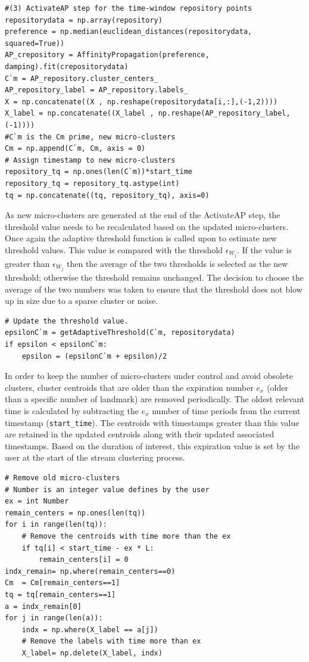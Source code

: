 \begin{lstlisting}
#(3) ActivateAP step for the time-window repository points
repositorydata = np.array(repository)
preference = np.median(euclidean_distances(repositorydata, squared=True))
AP_crepository = AffinityPropagation(preference, damping).fit(crepositorydata)
C`m = AP_repository.cluster_centers_
AP_repository_label = AP_repository.labels_
X = np.concatenate((X , np.reshape(repositorydata[i,:],(-1,2))))
X_label = np.concatenate((X_label , np.reshape(AP_repository_label,(-1))))
#C`m is the Cm prime, new micro-clusters
Cm = np.append(C`m, Cm, axis = 0)
# Assign timestamp to new micro-clusters
repository_tq = np.ones(len(C`m))*start_time
repository_tq = repository_tq.astype(int)
tq = np.concatenate((tq, repository_tq), axis=0)
\end{lstlisting}


As new micro-clusters are generated at the end of the ActivateAP step, the threshold value needs to be recalculated based on the updated micro-clusters. Once again the adaptive threshold function is called upon to estimate new threshold values. This value is compared with the threshold $\epsilon_{W_j}$. If the value is greater than $\epsilon_{W_j}$ then the average of the two thresholds is selected as the new threshold; otherwise the threshold remains unchanged. The decision to choose the average of the two numbers was taken to ensure that the threshold does not blow up in size due to a sparse cluster or noise.
\begin{lstlisting}
# Update the threshold value.
epsilonC`m = getAdaptiveThreshold(C`m, repositorydata)
if epsilon < epsilonC`m:
    epsilon = (epsilonC`m + epsilon)/2  
\end{lstlisting}

In order to keep the number of micro-clusters under control and avoid obsolete clusters, cluster centroids that are older than the expiration number $e_x$ (older than a specific number of landmark) are removed periodically. The oldest relevant time is calculated by subtracting the $e_x$ number of time periods from the current timestamp (\texttt{start\_time}). The centroids with timestamps greater than this value are retained in the updated centroids along with their updated associated timestamps. Based on the duration of interest, this expiration value is set by the user at the start of the stream clustering process. 



\begin{lstlisting}
# Remove old micro-clusters
# Number is an integer value defines by the user
ex = int Number
remain_centers = np.ones(len(tq))
for i in range(len(tq)):
    # Remove the centroids with time more than the ex
    if tq[i] < start_time - ex * L:
        remain_centers[i] = 0
indx_remain= np.where(remain_centers==0) 
Cm  = Cm[remain_centers==1]
tq = tq[remain_centers==1]
a = indx_remain[0]
for j in range(len(a)):
    indx = np.where(X_label == a[j])
    # Remove the labels with time more than ex
    X_label= np.delete(X_label, indx)

\end{lstlisting}


